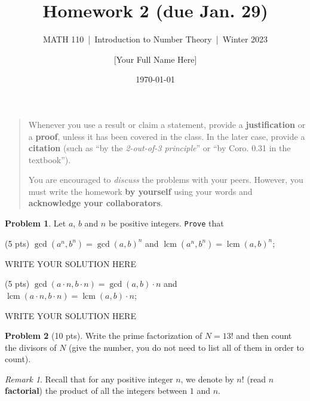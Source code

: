 \documentclass[11pt]{article}
\title{Homework 2 (due Jan. 29)}
\author{[Your Full Name Here]}
\subtitle{MATH 110~|~Introduction to Number Theory~|~Winter 2023}
\date{\today}
\theoremstyle{plain}
\theoremstyle{definition}
\newtheorem{problem}{Problem}
\theoremstyle{remark}
\newtheorem*{remark}{Remark}
\numberwithin{equation}{problem}
\DeclareMathOperator*\lcm{lcm}
\begin{document}
\maketitle

\begin{quotation}
	Whenever you use a result or claim a statement, provide a \textbf{justification} or a \textbf{proof}, unless it has been covered in the class. In the later case, provide a \textbf{citation} (such as ``by the \emph{2-out-of-3 principle}'' or ``by Coro. 0.31 in the textbook'').

	You are encouraged to \emph{discuss} the problems with your peers. However, you must write the homework \textbf{by yourself} using your words and \textbf{acknowledge your collaborators}.
\end{quotation}

\begin{problem}
	Let $a$, $b$ and $n$ be positive integers. \texttt{Prove} that 
	\begin{listinprob}
		\item (5 pts) $\gcd(a^n,b^n) = \gcd(a,b)^n$ and $\lcm(a^n,b^n) = \lcm(a,b)^n$;
		
\begin{solution} %
WRITE YOUR SOLUTION HERE
\end{solution}\clearpage %

		\item (5 pts) $\gcd(a\cdot n,b\cdot n) = \gcd(a,b)\cdot n$ and $\lcm(a\cdot n,b\cdot n) = \lcm(a,b)\cdot n$;
	\end{listinprob}	
\end{problem}
\begin{solution} %
WRITE YOUR SOLUTION HERE
\end{solution}\clearpage %






\begin{problem}[10 pts]
	Write the prime factorization of $N = 13!$ and then count the divisors of $N$ (give the number, you do not need to list all of them in order to count).
	\begin{remark}
		Recall that for any positive integer $n$, we denote by $n!$ (read \textbf{$n$ factorial}) the product of all the integers between $1$ and $n$.
	\end{remark}
\end{problem}
\end{document}
